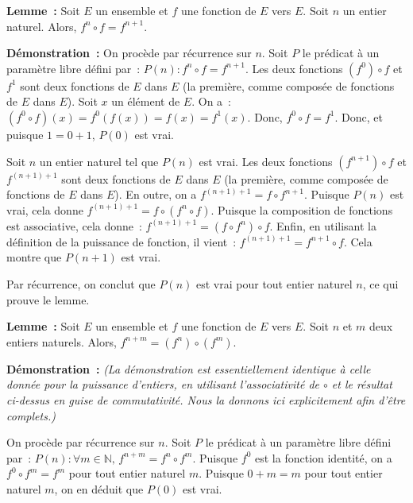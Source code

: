 \medskip

\noindent\textbf{Lemme :} 
    Soit $E$ un ensemble et $f$ une fonction de $E$ vers $E$.
    Soit $n$ un entier naturel. 
    Alors, $f^n \circ f = f^{n+1}$.

\medskip

\noindent\textbf{Démonstration :} On procède par récurrence sur $n$. 
    Soit $P$ le prédicat à un paramètre libre défini par : $P(n): f^n \circ f = f^{n+1}$.
    Les deux fonctions $(f^0) \circ f$ et $f^1$ sont deux fonctions de $E$ dans $E$ (la première, comme composée de fonctions de $E$ dans $E$). 
    Soit $x$ un élément de $E$. 
    On a : $(f^0 \circ f)(x) = f^0(f(x)) = f(x) = f^1(x)$. 
    Donc, $f^0 \circ f = f^1$.
    Donc, et puisque $1 = 0+1$, $P(0)$ est vrai. 
    
    Soit $n$ un entier naturel tel que $P(n)$ est vrai. 
    Les deux fonctions $(f^{n+1}) \circ f$ et $f^{(n+1)+1}$ sont deux fonctions de $E$ dans $E$ (la première, comme composée de fonctions de $E$ dans $E$). 
    En outre, on a $f^{(n+1)+1} = f \circ f^{n+1}$.
    Puisque $P(n)$ est vrai, cela donne $f^{(n+1)+1} = f \circ (f^n \circ f)$. 
    Puisque la composition de fonctions est associative, cela donne : $f^{(n+1)+1} = (f \circ f^n) \circ f$.
    Enfin, en utilisant la définition de la puissance de fonction, il vient : $f^{(n+1)+1} = f^{n+1} \circ f$.
    Cela montre que $P(n+1)$ est vrai.
    
    Par récurrence, on conclut que $P(n)$ est vrai pour tout entier naturel $n$, ce qui prouve le lemme. 

   \done 

\medskip

\noindent\textbf{Lemme :} 
    Soit $E$ un ensemble et $f$ une fonction de $E$ vers $E$.
    Soit $n$ et $m$ deux entiers naturels. 
    Alors, $f^{n+m} = (f^n) \circ (f^m)$.

\medskip

\noindent\textbf{Démonstration :} \textit{(La démonstration est essentiellement identique à celle donnée pour la puissance d'entiers, en utilisant l'associativité de $\circ$ et le résultat ci-dessus en guise de commutativité. Nous la donnons ici explicitement afin d'être complets.)}

    On procède par récurrence sur $n$. 
    Soit $P$ le prédicat à un paramètre libre défini par : $P(n) : \forall m \in \mathbb{N}, \, f^{n+m} = f^n \circ f^m$. 
    Puisque $f^0$ est la fonction identité, on a $f^0 \circ f^m = f^m$ pour tout entier naturel $m$. 
    Puisque $0 + m = m$ pour tout entier naturel $m$, on en déduit que $P(0)$ est vrai. 

